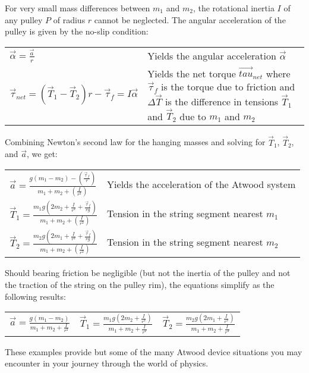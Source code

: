 % 
% 

For very small mass differences between $m_1$ and $m_2$, the rotational inertia $I$ of any pulley $P$ of radius $r$ cannot be neglected. The angular acceleration of the pulley is given by the no-slip condition:

\begin{longtable}{p{} p{}}
  \( \displaystyle\vec{\alpha} = \frac{\vec{a}}{r} \) & Yields the angular acceleration $\vec{\alpha}$ \\
  \(\displaystyle\vec{\tau}_{net}=\left(\vec{T}_1 - \vec{T}_2 \right)r - \vec{\tau}_f = I \vec{\alpha} \) & Yields the net torque $\vec{tau}_{net}$ where $\vec{\tau}_f$ is the torque due to friction and $\Delta\vec{T}$ is the difference in tensions $\vec{T}_1$ and $\vec{T}_2$ due to $m_1$ and $m_2$ \\
\end{longtable}

Combining Newton's second law for the hanging masses and solving for $\vec{T}_1$, $\vec{T}_2$, and $\vec{a}$, we get:

\begin{longtable}{p{} p{}}
  \( \displaystyle \vec{a} = \frac{g \left(m_1 - m_2 \right) - \left( \frac{\vec{\tau}_f}{r} \right)}{m_1 + m_2 + \left(\frac{I}{r^2} \right)}\) & Yields the acceleration of the Atwood system \\
  \(\displaystyle \vec{T}_1 = \frac{m_1 g \left(2 m_2 + \frac{I}{r^2} + \frac{\vec{\tau}_f}{r g} \right)}{m_1 + m_2 + \left(\frac{I}{r^2} \right)}\) & Tension in the string segment nearest $m_1$ \\
  \(\displaystyle \vec{T}_2 = \frac{m_2 g \left(2 m_1 + \frac{I}{r^2} + \frac{\vec{\tau}_f}{r g}\right)}{m_1 + m_2 + \left(\frac{I}{r^2}\right)} \) & Tension in the string segment nearest $m_2$
\end{longtable}

Should bearing friction be negligible (but not the inertia of the pulley and not the traction of the string on the pulley rim), the equations simplify as the following results:

\begin{longtable}{p{} p{} p{}}
  \( \displaystyle \vec{a} = \frac{g \left(m_1 - m_2 \right)}{m_1 + m_2 + \frac{I}{r^2}} \) & \( \displaystyle \vec{T}_1 = \frac{m_1 g \left(2 m_2 + \frac{I}{r^2} \right)}{m_1 + m_2 + \frac{I}{r^2}} \) & \( \displaystyle \vec{T}_2 = \frac{m_2 g \left(2 m_1 + \frac{I}{r^2} \right)}{m_1 + m_2 + \frac{I}{r^2}} \) \\
\end{longtable}

These examples provide but some of the many Atwood device situations you may encounter in your journey through the world of physics.

